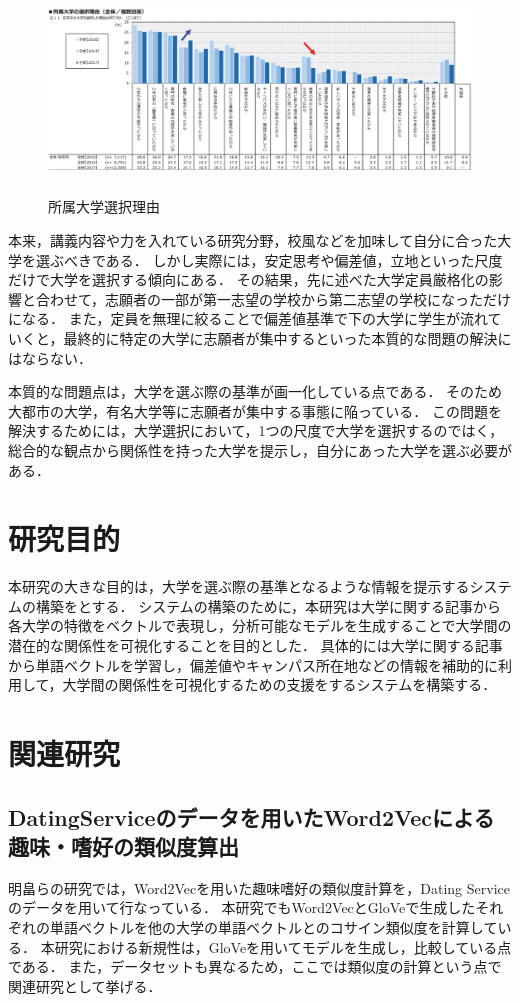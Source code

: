 \begin{figure}[H]
\centering
\includegraphics[height=5.5cm]{images/SS.jpg}
\caption{所属大学選択理由}
\label{fig:reason}
\end{figure}
本来，講義内容や力を入れている研究分野，校風などを加味して自分に合った大学を選ぶべきである．
しかし実際には，安定思考や偏差値，立地といった尺度だけで大学を選択する傾向にある．
その結果，先に述べた大学定員厳格化の影響と合わせて，志願者の一部が第一志望の学校から第二志望の学校になっただけになる．
また，定員を無理に絞ることで偏差値基準で下の大学に学生が流れていくと，最終的に特定の大学に志願者が集中するといった本質的な問題の解決にはならない．

本質的な問題点は，大学を選ぶ際の基準が画一化している点である．
そのため大都市の大学，有名大学等に志願者が集中する事態に陥っている．
この問題を解決するためには，大学選択において，1つの尺度で大学を選択するのではく，総合的な観点から関係性を持った大学を提示し，自分にあった大学を選ぶ必要がある．


\section{研究目的}
本研究の大きな目的は，大学を選ぶ際の基準となるような情報を提示するシステムの構築をとする．
システムの構築のために，本研究は大学に関する記事から各大学の特徴をベクトルで表現し，分析可能なモデルを生成することで大学間の潜在的な関係性を可視化することを目的とした．
具体的には大学に関する記事から単語ベクトルを学習し，偏差値やキャンパス所在地などの情報を補助的に利用して，大学間の関係性を可視化するための支援をするシステムを構築する．

\section{関連研究}
\subsection{DatingServiceのデータを用いたWord2Vecによる趣味・嗜好の類似度算出}
明畠ら\cite{thesis1}の研究では，Word2Vecを用いた趣味嗜好の類似度計算を，Dating Serviceのデータを用いて行なっている．
本研究でもWord2VecとGloVeで生成したそれぞれの単語ベクトルを他の大学の単語ベクトルとのコサイン類似度を計算している．
本研究における新規性は，GloVeを用いてモデルを生成し，比較している点である．
また，データセットも異なるため，ここでは類似度の計算という点で関連研究として挙げる．

